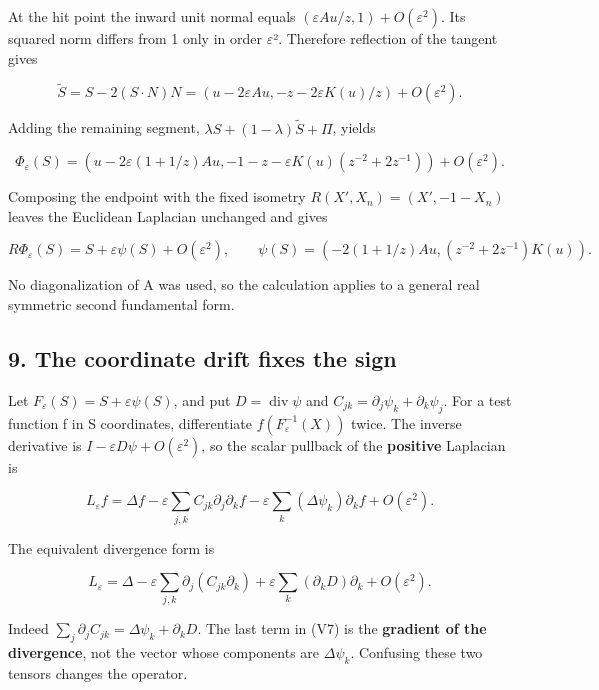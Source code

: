 \documentclass[
  11pt,
]{article}
\begin{document}
At the hit point the inward unit normal equals
\((\varepsilon Au/z,1)+O(\varepsilon^2)\). Its squared norm differs from
1 only in order \ensuremath{\varepsilon}². Therefore reflection of the tangent gives

\[
 \widetilde S=S-2(S\cdot N)N
 =\left(u-2\varepsilon Au,
       -z-2\varepsilon K(u)/z\right)+O(\varepsilon^2).
\]

Adding the remaining segment, \(\lambda S+(1-\lambda)\widetilde S+\Pi\),
yields

\[
 \Phi_\varepsilon(S)=
 \left(u-2\varepsilon(1+1/z)Au,
 -1-z-\varepsilon K(u)(z^{-2}+2z^{-1})\right)
 +O(\varepsilon^2).
 \tag{V4}
\]

Composing the endpoint with the fixed isometry \(R(X',X_n)=(X',-1-X_n)\)
leaves the Euclidean Laplacian unchanged and gives

\[
 R\Phi_\varepsilon(S)=S+\varepsilon\psi(S)+O(\varepsilon^2),\qquad
 \psi(S)=\left(-2(1+1/z)Au,(z^{-2}+2z^{-1})K(u)\right).
 \tag{V5}
\]

No diagonalization of A was used, so the calculation applies to a
general real symmetric second fundamental form.

\subsection{9. The coordinate drift fixes the
sign}\label{the-coordinate-drift-fixes-the-sign}

Let \(F_\varepsilon(S)=S+\varepsilon\psi(S)\), and put
\(D=\operatorname{div}\psi\) and
\(C_{jk}=\partial_j\psi_k+\partial_k\psi_j\). For a test function f in S
coordinates, differentiate \(f(F_\varepsilon^{-1}(X))\) twice. The
inverse derivative is \(I-\varepsilon D\psi+O(\varepsilon^2)\), so the
scalar pullback of the \textbf{positive} Laplacian is

\[
 L_\varepsilon f
 =\Delta f-\varepsilon\sum_{j,k}C_{jk}\partial_j\partial_k f
       -\varepsilon\sum_k(\Delta\psi_k)\partial_k f
       +O(\varepsilon^2).
 \tag{V6}
\]

The equivalent divergence form is

\[
 L_\varepsilon
 =\Delta-\varepsilon\sum_{j,k}\partial_j(C_{jk}\partial_k)
       +\varepsilon\sum_k(\partial_k D)\partial_k
       +O(\varepsilon^2).
 \tag{V7}
\]

Indeed \(\sum_j\partial_j C_{jk}=\Delta\psi_k+\partial_kD\). The last
term in (V7) is the \textbf{gradient of the divergence}, not the vector
whose components are \(\Delta\psi_k\). Confusing these two tensors
changes the operator.
\end{document}
